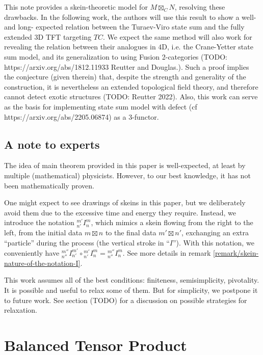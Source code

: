 This note provides a skein-theoretic model for $M \boxtimes_{C} N$, resolving these
drawbacks. In the following work, the authors will use this result to show a
well- and long- expected relation between the Turaev-Viro state sum and the
fully extended $3$D TFT targeting $TC$. We expect the same method will also
work for revealing the relation between their analogues in $4$D, i.e. the
Crane-Yetter state sum model, and its generalization to using Fusion
2-categories (TODO: https://arxiv.org/abs/1812.11933 Reutter and Douglas.).
Such a proof implies the conjecture (given therein) that, despite the strength
and generality of the construction, it is nevertheless an extended topological
field theory, and therefore cannot detect exotic structures (TODO: Reutter
2022). Also, this work can serve as the basis for implementing state sum model with defect (cf https://arxiv.org/abs/2205.06874) as a 3-functor.

\subsection*{A note to experts}\label{subsection/a-note-to-experts}

The idea of main theorem provided in this paper is well-expected, at least by
multiple (mathematical) physicists. However, to our best knowledge, it has not
been mathematically proven.

One might expect to see drawings of skeins in this paper, but we deliberately
avoid them due to the excessive time and energy they require. Instead, we
introduce the notation ${}^{m'}_{n'}I^{m}_{n}$, which mimics a skein flowing
from the right to the left, from the initial data $m \boxtimes n$ to the final data
$m' \boxtimes n'$, exchanging an extra ``particle'' during the process (the vertical
stroke in ``$I$''). With this notation, we conveniently have
${}^{m''}_{n''}I^{m'}_{n'} \circ {}^{m'}_{n'}I^{m}_{n} = {}^{m''}_{n''}I^{m}_{n}$.
See more details in remark \ref{remark/skein-nature-of-the-notation-I}.

This work assumes all of the best conditions: finiteness, semisimplicity,
pivotality. It is possible and useful to relax some of them. But for
simplicity, we postpone it to future work. See section (TODO) for a discussion
on possible strategies for relaxation.

\section{Balanced Tensor Product}\label{section/balanced-tensor-product}

